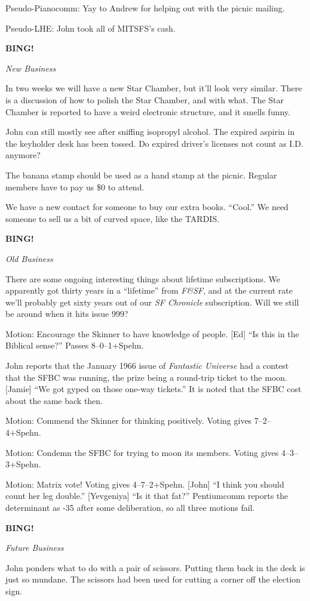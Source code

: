 \documentclass[12pt]{article}
\newcommand{\bing}{{\bf BING!} }
\newcommand{\goto}[1]{\bing \vskip 12pt \centerline{{\em{#1}}}}
\begin{document}
Pseudo-Pianocomm: Yay to Andrew for helping out with the picnic
mailing.

Pseudo-LHE: John took all of MITSFS's cash.

\goto{New Business}

In two weeks we will have a new Star Chamber, but it'll look very
similar.  There is a discussion of how to polish the Star Chamber,
and with what.  The Star Chamber is reported to have a weird
electronic structure, and it smells funny.

John can still mostly see after sniffing isopropyl alcohol.
The expired aspirin in the keyholder desk has been tossed.  Do
expired driver's licenses not count as I.D. anymore?

The banana stamp should be used as a hand stamp at the picnic.
Regular members have to pay us \$0 to attend.

We have a new contact for someone to buy our extra books.  ``Cool.''
We need someone to sell us a bit of curved space, like the TARDIS.

\goto{Old Business}

There are some ongoing interesting things about lifetime
subscriptions.  We apparently got thirty years in a ``lifetime''
from {\em F\&SF}, and at the current rate we'll probably get
sixty years out of our {\em SF Chronicle} subscription.  Will
we still be around when it hits issue 999?

Motion: Encourage the Skinner to have knowledge of people.  [Ed]
``Is this in the Biblical sense?''  Passes 8--0--1+Spehn.

John reports that the January 1966 issue of {\em Fantastic Universe}
had a contest that the SFBC was running, the prize being a round-trip
ticket to the moon.  [Jamie] ``We got gyped on those one-way tickets.''
It is noted that the SFBC cost about the same back then.

Motion: Commend the Skinner for thinking positively.  Voting gives
7--2--4+Spehn.

Motion: Condemn the SFBC for trying to moon its members.  Voting
gives 4--3--3+Spehn.

Motion: Matrix vote!  Voting gives 4--7--2+Spehn.  [John] ``I think
you should count her leg double.''  [Yevgeniya] ``Is it that fat?''
Pentiumcomm reports the determinant as -35 after some deliberation,
so all three motions fail.

\goto{Future Business}

John ponders what to do with a pair of scissors.  Putting them back
in the desk is just so mundane.  The scissors had been used for
cutting a corner off the election sign.
\end{document}
